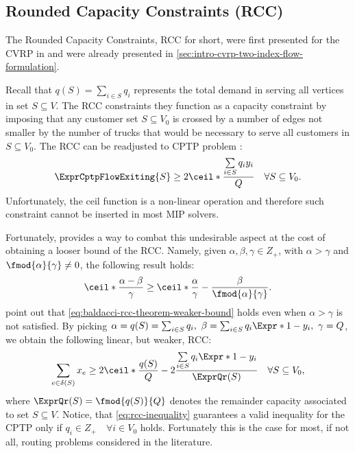 \subsection{Rounded Capacity Constraints (RCC)}
\label{sec:cptp-rcc}

The Rounded Capacity Constraints, RCC for short, were first presented
for the CVRP  in \cite{laporte1983}
and were already presented in \cref{sec:intro-cvrp-two-index-flow-formulation}.

Recall that $q(S) = \sum_{i \in S} q_i$ represents
the total demand in serving all vertices in set $S \subseteq V$.
The RCC constraints they function as a capacity constraint
by imposing that any customer set $S \subseteq V_0$ is crossed by a number of edges
not smaller by the number of trucks that would be necessary to serve all customers in $S \subseteq V_0$.
The RCC can be readjusted to CPTP problem \parencite{jepsen2014}:
\begin{equation}
	\label{eq:cptp-rcc-inequality-original}
	\ExprCptpFlowExiting{S} \ge 2 \ceil*{\frac{\sum\limits_{i \in S} q_i y_i}{Q}} \quad \forall S \subseteq V_0.
\end{equation}
Unfortunately, the ceil function is a non-linear operation and therefore
such constraint cannot be inserted in most MIP solvers.

Fortunately, \textcite{baldacci2007capacitated} provides a way to
combat this undesirable aspect at the cost of obtaining a looser bound of the RCC.
Namely, given $\alpha, \beta, \gamma \in Z_+$, with $\alpha > \gamma$ and
$\fmod{\alpha}{\gamma} \ne 0$, the following result holds:
\begin{equation}
	\label{eq:baldacci-rcc-theorem-weaker-bound}
	\ceil*{\frac{\alpha - \beta}{\gamma}} \ge \ceil*{\frac{\alpha}{\gamma}} - \frac{\beta}{\fmod{\alpha}{\gamma}}.
\end{equation}
\textcite{jepsen2014} point out that \cref{eq:baldacci-rcc-theorem-weaker-bound}
holds even when $\alpha > \gamma$ is not satisfied.
By picking $\alpha = q(S) = \sum_{i \in S} q_i,\ \beta = \sum_{i \in S} q_i\Expr*{1 - y_i},\ \gamma = Q$,
we obtain the following linear, but weaker, RCC:
\begin{equation}
	\label{eq:rcc-inequality}
	\begin{split}
		\sum\limits_{e \in \delta(S)} x_e \ge 2 \ceil*{\frac{q(S)}{Q}} - 2 \frac{\sum\limits_{i \in S} q_i \Expr*{1 - y_i}}{\ExprQr(S)} \quad \forall S \subseteq V_0,
	\end{split}
\end{equation}
where $\ExprQr(S) = \fmod{q(S)}{Q}$ denotes the remainder capacity associated to set $S \subseteq V$.
Notice, that \cref{eq:rcc-inequality} guarantees a valid inequality for the CPTP
only if $q_i \in Z_+ \quad \forall i \in V_0$ holds.
Fortunately this is the case for most, if not all, routing problems considered in the literature.

